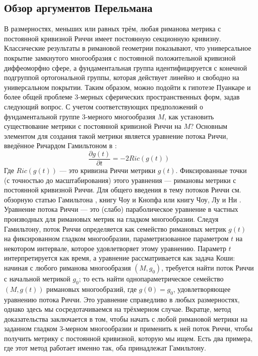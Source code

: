 \subsection{Обзор аргументов Перельмана}
В размерностях, меньших или равных трём, любая риманова метрика с 
постоянной кривизной Риччи имеет постоянную секционную кривизну. 
Классические результаты в римановой геометрии показывают, что 
универсальное покрытие замкнутого многообразия с постоянной 
положительной кривизной диффеоморфно сфере, а фундаментальная 
группа идентифицируется с конечной подгруппой ортогональной группы, 
которая действует линейно и свободно на универсальном покрытии. 
Таким образом, можно подойти к гипотезе Пуанкаре и более общей 
проблеме 3-мерных сферических пространственных форм, задав следующий 
вопрос. С учетом соответствующих предположений о фундаментальной 
группе 3-мерного многообразия $M$, как установить существование 
метрики с постоянной кривизной Риччи на $M$? 
Основным элементом для создания такой метрики является уравнение 
потока Риччи, введённое Ричардом Гамильтоном в \cite{c29}:
\[
\frac{\partial g(t)}{\partial t} = -2Ric(g(t))
\]
Где $Ric(g(t))$ — это кривизна Риччи метрики $g(t)$. Фиксированные точки 
(с точностью до масштабирования) этого уравнения — римановы метрики с 
постоянной кривизной Риччи. Для общего введения в тему потоков Риччи 
см. обзорную статью Гамильтона \cite{c34}, книгу Чоу и Кнопфа \cite{c13} или 
книгу Чоу, Лу и Ни \cite{c14}.
Уравнение потока Риччи — это (слабо) параболическое уравнение в 
частных производных для римановых метрик на гладком многообразии. 
Следуя Гамильтону, поток Риччи определяется как семейство римановых 
метрик $g(t)$ на фиксированном гладком многообразии, параметризованное параметром 
$t$ на некотором интервале, которое удовлетворяет этому уравнению. 
Параметр $t$ интерпретируется как время, а уравнение рассматривается 
как задача Коши: начиная с любого риманова многообразия $(M, g_{0})$, 
требуется найти поток Риччи с начальной метрикой $g_{0}$; то есть найти 
однопараметрическое семейство $(M, g(t))$ римановых многообразий, 
где $g(0) = g_{0}$, удовлетворяющее уравнению потока Риччи. 
Это уравнение справедливо в любых размерностях, однако здесь мы 
сосредотачиваемся на трёхмерном случае.
Вкратце, метод доказательства заключается в том, чтобы начать с 
любой римановой метрики на заданном гладком 3-мерном многообразии 
и применить к ней поток Риччи, чтобы получить метрику с постоянной 
кривизной, которую мы ищем. Есть два примера, где этот метод 
работает именно так, оба принадлежат Гамильтону.\\
